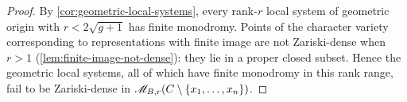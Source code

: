 \begin{proof}
  By \cref{cor:geometric-local-systems}, every rank-$r$ local system of geometric
  origin with $r < 2\sqrt{g+1}$ has finite monodromy. Points of the character
  variety corresponding to representations with finite image are not Zariski-dense
  when $r > 1$ (\cref{lem:finite-image-not-dense}): they lie in a proper closed
  subset. Hence the geometric local systems, all of which have finite monodromy in
  this rank range, fail to be Zariski-dense in
  $\mathscr{M}_{B,r}(C \setminus \{x_1, \ldots, x_n\})$.
\end{proof}
